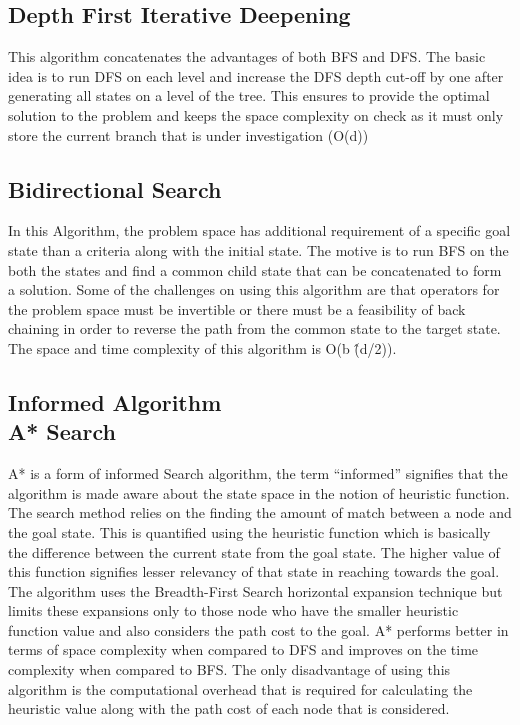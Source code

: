 \documentclass{svproc}
\begin{document}
\subsection{Depth First Iterative Deepening}
This algorithm concatenates the advantages of both BFS and DFS. The basic idea is to run DFS on each level and increase the DFS depth cut-off by one after generating all states on a level of the tree. This ensures to provide the optimal solution to the problem and keeps the space complexity on check as it must only store the current branch that is under investigation (O(d))
\subsection{Bidirectional Search}
In this Algorithm, the problem space has additional requirement of a specific goal state than a criteria along with the initial state. The motive is to run BFS on the both the states and find a common child state that can be concatenated to form a solution. Some of the challenges on using this algorithm are that  operators for the problem space must be invertible or there must be a feasibility of back chaining in order to reverse the path from the common state to the target state. The space and time complexity of this algorithm is O(b \^(d/2)).

\subsection{Informed Algorithm 
\\A* Search }
A* is a form of informed Search algorithm, the term “informed” signifies that the algorithm is made aware about the state space in the notion of heuristic function. The search method relies on the finding the amount of match between a node and the goal state. This is quantified using the heuristic function which is basically the difference between the current state from the goal state. The higher value of this function signifies lesser relevancy of that state in reaching towards the goal. The algorithm uses the Breadth-First Search horizontal expansion technique but limits these expansions only to those node who have the smaller heuristic function value and also considers the path cost to the goal. A* performs better in terms of space complexity when compared to DFS  and  improves on the time complexity  when compared to BFS. The only disadvantage of using this algorithm is the computational overhead that is required for calculating the heuristic value along with the path cost of each node that is considered. 
\end{document}
